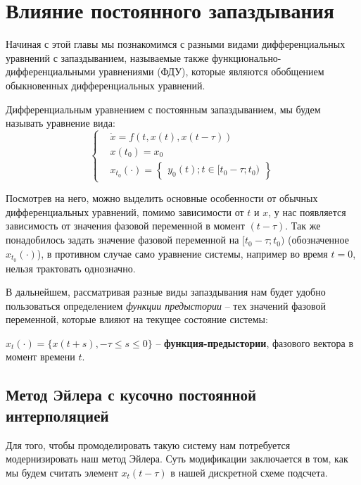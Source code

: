\chapter{Влияние постоянного запаздывания}\label{lab6}

Начиная с этой главы мы познакомимся с разными видами
дифференциальных уравнений с запаздыванием, называемые
также функционально-дифференциальными уравнениями (ФДУ),
которые являются обобщением обыкновенных дифференциальных
уравнений.

\begin{definition}
    Дифференциальным уравнением с постоянным запаздыванием,
    мы будем называть уравнение вида:
    \begin{equation*}
        \begin{cases}
            &\dot{x} = f(t, x(t), x(t - \tau)) \\
            &x(t_0) = x_0 \\
            &x_{t_0}(\cdot) = \begin{Bmatrix}y_0(t); t \in [t_0 -\tau; t_0)\end{Bmatrix}
        \end{cases}
    \end{equation*}
\end{definition}

Посмотрев на него, можно выделить основные особенности от обычных дифференциальных
уравнений, помимо зависимости от $t$ и $x$, у нас появляется зависимость от
значения фазовой переменной в момент $(t-\tau)$. Так же
понадобилось задать значение фазовой переменной на $[t_0 -\tau; t_0)$
(обозначенное $x_{t_0}(\cdot)$),
в противном случае само уравнение системы, например во время $t=0$,
нельзя трактовать однозначно.

В дальнейшем, рассматривая разные виды запаздывания нам
будет удобно пользоваться определением \textit{функции предыстории}
-- тех значений фазовой переменной, которые влияют на текущее
состояние системы:

\begin{definition}
    $x_t(\cdot) = \{x(t + s), -\tau \leq s \leq 0 \}$ --
    \textbf{функция-предыстории}, фазового вектора в момент времени $t$.
\end{definition}

\section{Метод Эйлера с кусочно постоянной интерполяцией}
Для того, чтобы промоделировать такую систему нам потребуется
модернизировать наш метод Эйлера. Суть модификации заключается
в том, как мы будем считать элемент $x_t(t - \tau)$ в нашей
дискретной схеме подсчета.

